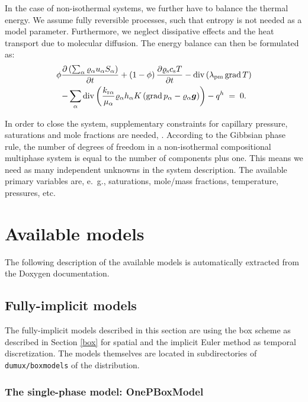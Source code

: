 In the case of non-isothermal systems, we further have to balance the
thermal energy. We assume fully reversible processes, such that entropy
is not needed as a model parameter. Furthermore, we neglect 
dissipative effects and the heat transport due to molecular
diffusion. The energy balance can then be
formulated as:
%
\begin{multline}
  \label{A3:eqenergmak1}
  \phi \frac{\partial \left( \sum_\alpha \varrho_{\alpha}
      u_\alpha S_\alpha \right)}{\partial t} + \left( 1 -
    \phi \right) \frac{\partial \varrho_{\text{s}} c_{\text{s}}
    T}{\partial t}  
 - \operatorname{div} \left( \lambda_{\text{pm}} \operatorname{grad} T \right)
   \\
   - \sum\limits_\alpha \operatorname{div} \left( \frac{k_{\text{r}
        \alpha}}{\mu_\alpha} \varrho_{\alpha} h_\alpha
    K \left( \operatorname{grad} p_\alpha - \varrho_{\alpha}
      \boldsymbol{g} \right) \right)  
 - q^h \; = \; 0.
\end{multline}

In order to close the system, supplementary constraints for capillary pressure, saturations and mole
fractions are needed, \cite{A3:helmig:1997}. 
According to the Gibbsian phase rule, the number of degrees of freedom
in a non-isothermal compositional multiphase system is equal to the
number of components plus one. This means we need as many independent
unknowns in the system description. The
available primary variables are, e.\ g., saturations, mole/mass
fractions, temperature, pressures, etc.




\section{Available models} 
The following description of the available models is automatically extracted 
from the Doxygen documentation.

\subsection{Fully-implicit models} 

The fully-implicit models described in this section are using the box
scheme as described in Section \ref{box} for spatial and the implicit Euler
method as temporal discretization. The models themselves are located in
subdirectories of \texttt{dumux/boxmodels} of the \eWoms distribution.

\subsubsection{The single-phase model: OnePBoxModel} 


